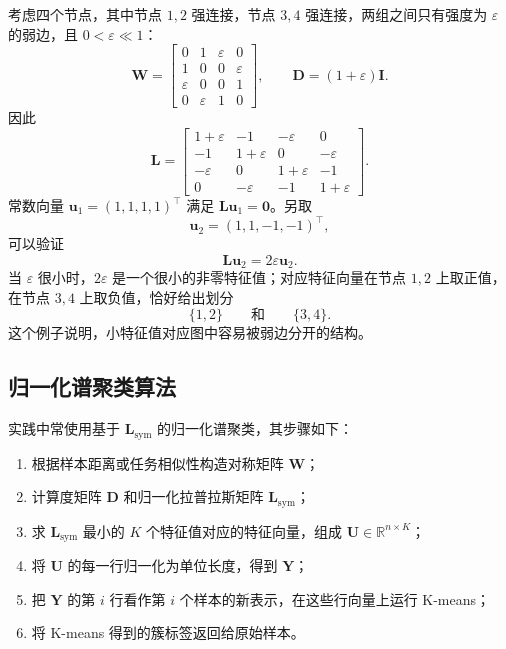 \documentclass[UTF8,zihao=-4,openany]{ctexbook}
\begin{document}
考虑四个节点，其中节点 \(1,2\) 强连接，节点 \(3,4\) 强连接，两组之间只有强度为 \(\varepsilon\) 的弱边，且 \(0<\varepsilon\ll1\)：
\[
  \boldsymbol W
  =
  \begin{bmatrix}
    0&1&\varepsilon&0\\
    1&0&0&\varepsilon\\
    \varepsilon&0&0&1\\
    0&\varepsilon&1&0
  \end{bmatrix},
  \qquad
  \boldsymbol D=(1+\varepsilon)\boldsymbol I.
\]
因此
\[
  \boldsymbol L
  =
  \begin{bmatrix}
    1+\varepsilon&-1&-\varepsilon&0\\
    -1&1+\varepsilon&0&-\varepsilon\\
    -\varepsilon&0&1+\varepsilon&-1\\
    0&-\varepsilon&-1&1+\varepsilon
  \end{bmatrix}.
\]
常数向量
\(
\boldsymbol u_1=(1,1,1,1)^\top
\)
满足 \(\boldsymbol L\boldsymbol u_1=\boldsymbol0\)。另取
\[
  \boldsymbol u_2=(1,1,-1,-1)^\top,
\]
可以验证
\begin{equation}
  \boldsymbol L\boldsymbol u_2
  =
  2\varepsilon\boldsymbol u_2.
  \label{eq:four-node-fiedler}
\end{equation}
当 \(\varepsilon\) 很小时，\(2\varepsilon\) 是一个很小的非零特征值；对应特征向量在节点 \(1,2\) 上取正值，在节点 \(3,4\) 上取负值，恰好给出划分
\[
  \{1,2\}
  \qquad\text{和}\qquad
  \{3,4\}.
\]
这个例子说明，小特征值对应图中容易被弱边分开的结构。

\subsection{归一化谱聚类算法}

实践中常使用基于 \(\boldsymbol L_{\mathrm{sym}}\) 的归一化谱聚类，其步骤如下：

\begin{enumerate}
  \item 根据样本距离或任务相似性构造对称矩阵 \(\boldsymbol W\)；
  \item 计算度矩阵 \(\boldsymbol D\) 和归一化拉普拉斯矩阵 \(\boldsymbol L_{\mathrm{sym}}\)；
  \item 求 \(\boldsymbol L_{\mathrm{sym}}\) 最小的 \(K\) 个特征值对应的特征向量，组成 \(\boldsymbol U\in\mathbb R^{n\times K}\)；
  \item 将 \(\boldsymbol U\) 的每一行归一化为单位长度，得到 \(\boldsymbol Y\)；
  \item 把 \(\boldsymbol Y\) 的第 \(i\) 行看作第 \(i\) 个样本的新表示，在这些行向量上运行 K-means；
  \item 将 K-means 得到的簇标签返回给原始样本。
\end{enumerate}
\end{document}
